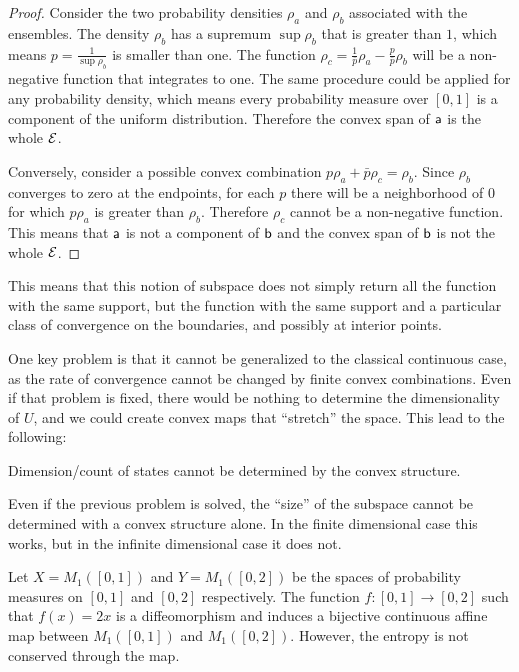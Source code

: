 \begin{proof}
	Consider the two probability densities $\rho_a$ and $\rho_b$ associated with the ensembles. The density $\rho_b$ has a supremum $\sup \rho_b$ that is greater than $1$, which means $p = \frac{1}{\sup \rho_b}$ is smaller than one. The function $\rho_c = \frac{1}{\bar{p}} \rho_a - \frac{p}{\bar{p}}\rho_b$ will be a non-negative function that integrates to one. The same procedure could be applied for any probability density, which means every probability measure over $[0,1]$ is a component of the uniform distribution. Therefore the convex span of $\ens[a]$ is the whole $\Ens$.
	
	Conversely, consider a possible convex combination $p \rho_a + \bar{p} \rho_c = \rho_b$. Since $\rho_b$ converges to zero at the endpoints, for each $p$ there will be a neighborhood of $0$ for which $p\rho_a$ is greater than $\rho_b$. Therefore $\rho_c$ cannot be a non-negative function. This means that $\ens[a]$ is not a component of $\ens[b]$ and the convex span of $\ens[b]$ is not the whole $\Ens$.
\end{proof}

This means that this notion of subspace does not simply return all the function with the same support, but the function with the same support and a particular class of convergence on the boundaries, and possibly at interior points.

One key problem is that it cannot be generalized to the classical continuous case, as the rate of convergence cannot be changed by finite convex combinations. Even if that problem is fixed, there would be nothing to determine the dimensionality of $U$, and we could create convex maps that ``stretch'' the space. This lead to the following:

\begin{insight}
	Dimension/count of states cannot be determined by the convex structure.
\end{insight}

Even if the previous problem is solved, the ``size'' of the subspace cannot be determined with a convex structure alone. In the finite dimensional case this works, but in the infinite dimensional case it does not. 

\begin{prop}
	Let $X=M_1([0,1])$ and $Y=M_1([0,2])$ be the spaces of probability measures on $[0,1]$ and $[0,2]$ respectively. The function $f : [0,1] \to [0,2]$ such that $f(x) = 2x$ is a diffeomorphism and induces a bijective continuous affine map between $M_1([0,1])$ and $M_1([0,2])$. However, the entropy is not conserved through the map.
\end{prop}

